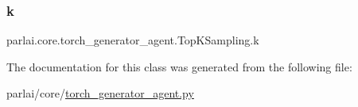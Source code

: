 \subsubsection{\texorpdfstring{k}{k}}
{\footnotesize\ttfamily parlai.\+core.\+torch\+\_\+generator\+\_\+agent.\+Top\+K\+Sampling.\+k}



The documentation for this class was generated from the following file\+:\begin{DoxyCompactItemize}
\item 
parlai/core/\hyperlink{torch__generator__agent_8py}{torch\+\_\+generator\+\_\+agent.\+py}\end{DoxyCompactItemize}

